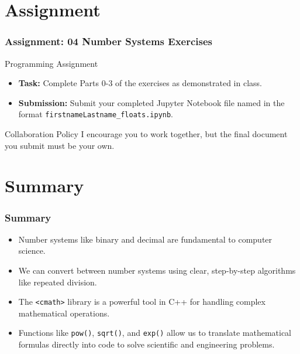 \documentclass{beamer}
\begin{document}
\section{Assignment}
\begin{frame}
\frametitle{Assignment: 04 Number Systems Exercises}
\begin{block}{Programming Assignment}
    \begin{itemize}
        \item \textbf{Task:} Complete Parts 0-3 of the exercises as demonstrated in class.
        \item \textbf{Submission:} Submit your completed Jupyter Notebook file named in the format \alert{\texttt{firstnameLastname\_floats.ipynb}}.
    \end{itemize}
\end{block}
\vfill
\begin{alertblock}{Collaboration Policy}
I encourage you to work together, but the final document you submit must be your own.
\end{alertblock}
\end{frame}

\section{Summary}

\begin{frame}
\frametitle{Summary}
\begin{itemize}
    \item Number systems like \alert{binary} and \alert{decimal} are fundamental to computer science.
    \item We can convert between number systems using clear, step-by-step algorithms like \alert{repeated division}.
    \item The \texttt{<cmath>} library is a powerful tool in C++ for handling complex mathematical operations.
    \item Functions like \texttt{pow()}, \texttt{sqrt()}, and \texttt{exp()} allow us to translate mathematical formulas directly into code to solve scientific and engineering problems.
\end{itemize}
\end{frame}
\end{document}
